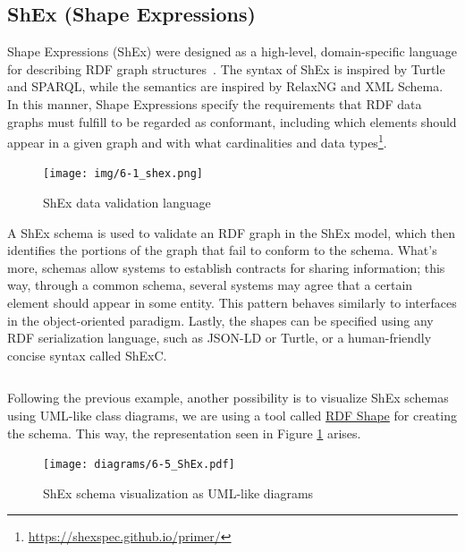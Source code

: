 \subsection{ShEx (Shape Expressions)}

Shape Expressions (ShEx) were designed as a high-level, domain-specific language for describing RDF graph structures~\cite{https://doi.org/10.48550/arxiv.2110.11709}. The syntax of ShEx is inspired by Turtle and SPARQL, while the semantics are inspired by RelaxNG and XML Schema. In this manner, Shape Expressions specify the requirements that RDF data graphs must fulfill to be regarded as conformant, including which elements should appear in a given graph and with what cardinalities and data types\footnote{\url{https://shexspec.github.io/primer/}}.

\begin{figure}[ht]
    \centering
    \texttt{[image: img/6-1\_shex.png]}
    \caption{ShEx data validation language}
\end{figure}

A ShEx schema is used to validate an RDF graph in the ShEx model, which then identifies the portions of the graph that fail to conform to the schema. What's more, schemas allow systems to establish contracts for sharing information; this way, through a common schema, several systems may agree that a certain element should appear in some entity. This pattern behaves similarly to interfaces in the object-oriented paradigm. Lastly, the shapes can be specified using any RDF serialization language, such as JSON-LD or Turtle, or a human-friendly concise syntax called ShExC.

\label{code:shex}
\begin{code}
    \inputminted{shexc}{code/listings/6-4_shex.shex}
\end{code}

Following the previous example, another possibility is to visualize ShEx schemas using UML-like class diagrams, we are using a tool called \href{https://rdfshape.weso.es/shexInfo}{RDF Shape} for creating the schema. This way, the representation seen in Figure \ref{fig:RDFshape} arises.

\begin{figure}[ht]
    \centering
    \texttt{[image: diagrams/6-5\_ShEx.pdf]}
    \caption{ShEx schema visualization as UML-like diagrams}
    \label{fig:RDFshape}
\end{figure}

